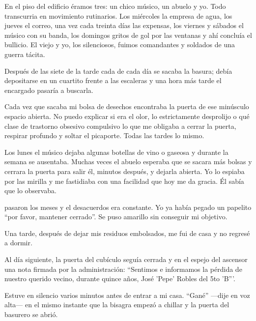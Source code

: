 
En el piso del edificio éramos tres: un chico músico, un abuelo y yo.
Todo transcurria en movimiento rutinarios. Los miércoles la empresa de agua,
los jueves el correo, una vez cada treinta días las expensas, los viernes y
sábados el músico con su banda, los domingos gritos de gol por las ventanas
y ahí concluía el bullicio. El viejo y yo, los silenciosos, fuimos comandantes
y soldados de una guerra tácita.

Después de las siete de la tarde cada de cada día se sacaba la basura; debía
depositarse en un cuartito frente a las escaleras y una hora más tarde el 
encargado pasaría a buscarla.

Cada vez que sacaba mi bolsa de desechos encontraba la puerta de ese minúsculo
espacio abierta. No puedo explicar si era el olor, lo estrictamente desprolijo
o qué clase de trastorno obsesivo compulsivo lo que me obligaba a cerrar la
puerta, respirar profundo y soltar el picaporte. Todas las tardes lo mismo.

Los lunes el músico dejaba algunas botellas de vino o gaseosa y durante la 
semana se ausentaba. Muchas veces el abuelo esperaba que se sacara más bolsas
y cerrara la puerta para salir él, minutos después, y dejarla abierta. Yo lo
espiaba por las mirilla y me fastidiaba con una facilidad que hoy me da gracia.
Él sabía que lo observaba.

pasaron los meses y el desacuerdos era constante. Yo ya había pegado un
papelito ``por favor, mantener cerrado''. Se puso amarillo sin conseguir mi 
objetivo.

Una tarde, después de dejar mis residuos embolsados, me fui de casa y no
regresé a dormir.

Al día siguiente, la puerta del cubículo seguía cerrada y en el espejo del
ascensor una nota firmada por la administración: ``Sentimos e informamos la
pérdida de nuestro querido vecino, durante quince años, José 'Pepe' Robles
del 5to 'B'''.

Estuve en silencio varios minutos antes de entrar a mi casa. ``Gané'' ---dije
en voz alta--- en el mismo instante que la bisagra empezó a chillar y la 
puerta del basurero se abrió.
